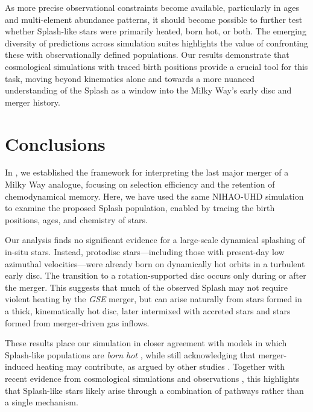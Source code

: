 \documentclass[fleqn,usenatbib]{mnras}
\begin{document}
As more precise observational constraints become available, particularly in ages and multi-element abundance patterns, it should become possible to further test whether Splash-like stars were primarily heated, born hot, or both. The emerging diversity of predictions across simulation suites \citep{Brooks2025} highlights the value of confronting these with observationally defined populations. Our results demonstrate that cosmological simulations with traced birth positions provide a crucial tool for this task, moving beyond kinematics alone and towards a more nuanced understanding of the Splash as a window into the Milky Way’s early disc and merger history.

\section{Conclusions}
\label{sec:conclusions}

In , we established the framework for interpreting the last major merger of a Milky Way analogue, focusing on selection efficiency and the retention of chemodynamical memory. Here, we have used the same NIHAO-UHD simulation to examine the proposed Splash population, enabled by tracing the birth positions, ages, and chemistry of stars.

Our analysis finds no significant evidence for a large-scale dynamical splashing of in-situ stars. Instead, protodisc stars—including those with present-day low azimuthal velocities—were already born on dynamically hot orbits in a turbulent early disc. The transition to a rotation-supported disc occurs only during or after the merger. This suggests that much of the observed Splash may not require violent heating by the \textit{GSE} merger, but can arise naturally from stars formed in a thick, kinematically hot disc, later intermixed with accreted stars and stars formed from merger-driven gas inflows.

These results place our simulation in closer agreement with models in which Splash-like populations are \emph{born hot} \citep[e.g.][]{Amarante2020}, while still acknowledging that merger-induced heating may contribute, as argued by other studies \citep[e.g.][]{DiMatteo2019, Belokurov2020, Bonaca2020}. Together with recent evidence from cosmological simulations and observations \citep{Dillamore2022, Dillamore2023, Dillamore2025, Kisku2025}, this highlights that Splash-like stars likely arise through a combination of pathways rather than a single mechanism.
\end{document}
